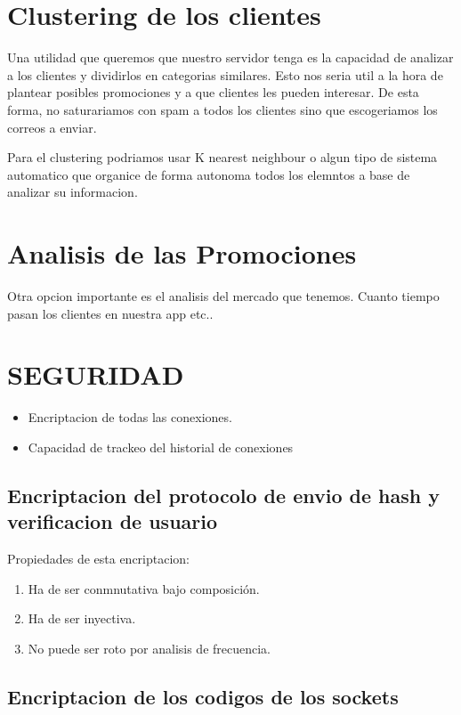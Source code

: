 \documentclass{article}
\theoremstyle{definition}
\begin{document}
\section{Clustering de los clientes}

Una utilidad que queremos que nuestro servidor tenga es la capacidad de analizar a los clientes y dividirlos en categorias similares. Esto nos seria util a la hora de plantear posibles promociones y a que clientes les pueden interesar. De esta forma, no saturariamos con spam a todos los clientes sino que escogeriamos los correos a enviar. 

Para el clustering podriamos usar K nearest neighbour o algun tipo de sistema automatico que organice de forma autonoma todos los elemntos a base de analizar su informacion.

\section{Analisis de las Promociones}

Otra opcion importante es el analisis del mercado que tenemos. Cuanto tiempo pasan los clientes en nuestra app etc..

\section{SEGURIDAD}

\begin{itemize}
    \item Encriptacion de todas las conexiones.
    \item Capacidad de trackeo del historial de conexiones
\end{itemize}

\subsection{Encriptacion del protocolo de envio de hash y verificacion de usuario}

Propiedades de esta encriptacion:
\begin{enumerate}
\item Ha de ser conmnutativa bajo composición.
\item Ha de ser inyectiva.
\item No puede ser roto por analisis de frecuencia.
\end{enumerate}

\subsection{Encriptacion de los codigos de los sockets}
\end{document}
